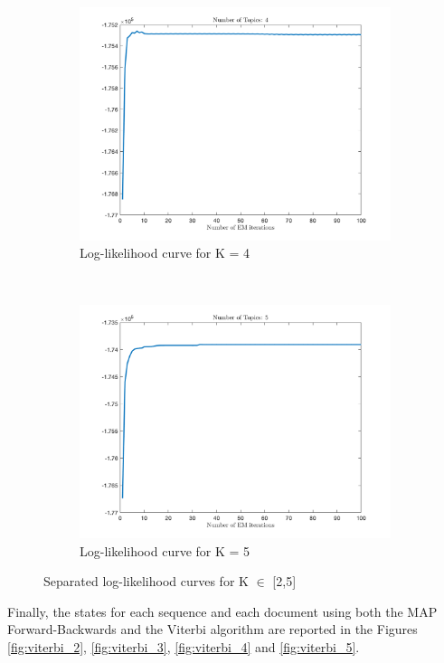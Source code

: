 \documentclass[12pt]{article}
\begin{document}
\begin{figure}[h]
\begin{subfigure}{0.45\textwidth}
		\includegraphics[width=\textwidth]{images/Q_4_topics.png}
		\caption{Log-likelihood curve for K = 4}
		\label{fig:Q4}
	\end{subfigure}
	~	
	\begin{subfigure}{0.45\textwidth}
		\includegraphics[width=\textwidth]{images/Q_5_topics.png}
		\caption{Log-likelihood curve for K = 5}
		\label{fig:Q5}
	\end{subfigure}
	\caption{Separated log-likelihood curves for K $\in$ [2,5]}
	\label{fig:Q_all}
\end{figure}

Finally, the states for each sequence and each document using both the MAP Forward-Backwards and the Viterbi algorithm are reported in  the Figures \ref{fig:viterbi_2}, \ref{fig:viterbi_3}, \ref{fig:viterbi_4} and \ref{fig:viterbi_5}.
\end{document}
